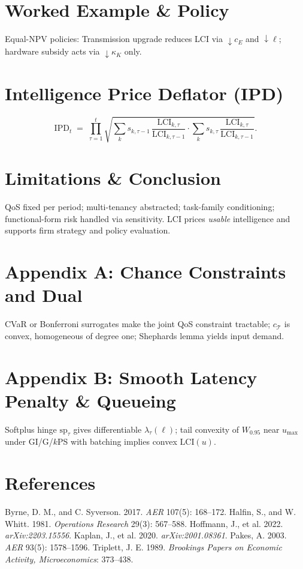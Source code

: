 ﻿\documentclass[12pt]{article}
\numberwithin{equation}{section}
\newcommand{\LCI}{\mathrm{LCI}}
\newcommand{\IPD}{\mathrm{IPD}}
\begin{document}
\section{Worked Example \& Policy}
Equal-NPV policies: Transmission upgrade reduces LCI via $\downarrow c_E$ and $\downarrow \ell$; hardware subsidy acts via $\downarrow \kappa_K$ only.

\section{Intelligence Price Deflator (IPD)}
\begin{equation}
\IPD_t \;=\; \prod_{\tau=1}^{t} \sqrt{
\sum_k s_{k,\tau-1}\,\frac{\LCI_{k,\tau}}{\LCI_{k,\tau-1}}
\cdot
\sum_k s_{k,\tau}\,\frac{\LCI_{k,\tau}}{\LCI_{k,\tau-1}}
}.
\end{equation}

\section{Limitations \& Conclusion}
QoS fixed per period; multi-tenancy abstracted; task-family conditioning; functional-form risk handled via sensitivity. LCI prices \emph{usable} intelligence and supports firm strategy and policy evaluation.

\section*{Appendix A: Chance Constraints and Dual}
CVaR or Bonferroni surrogates make the joint QoS constraint tractable; $c_{\mathcal T}$ is convex, homogeneous of degree one; Shephards lemma yields input demand.

\section*{Appendix B: Smooth Latency Penalty \& Queueing}
Softplus hinge $\mathrm{sp}_\tau$ gives differentiable $\lambda_\tau(\ell)$; tail convexity of $W_{0.95}$ near $u_{\max}$ under GI/G/$k$PS with batching implies convex $\LCI(u)$.

\section*{References}
\begin{thebibliography}{}
 Byrne, D. M., and C. Syverson. 2017. \emph{AER} 107(5): 168--172.
 Halfin, S., and W. Whitt. 1981. \emph{Operations Research} 29(3): 567--588.
 Hoffmann, J., et al. 2022. \emph{arXiv:2203.15556}.
 Kaplan, J., et al. 2020. \emph{arXiv:2001.08361}.
 Pakes, A. 2003. \emph{AER} 93(5): 1578--1596.
 Triplett, J. E. 1989. \emph{Brookings Papers on Economic Activity, Microeconomics}: 373--438.
\end{thebibliography}
\end{document}
